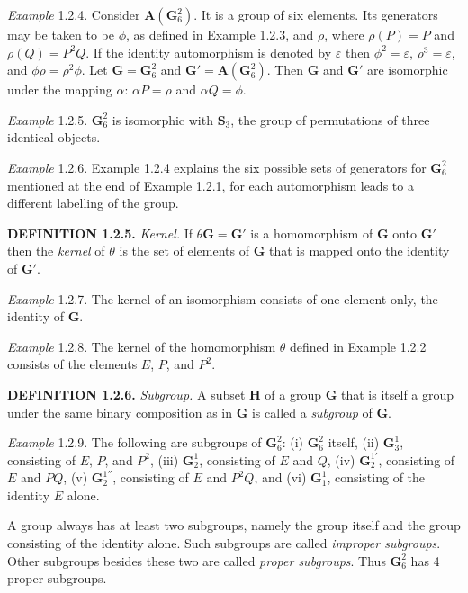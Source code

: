 \documentclass[11pt,a4paper,twoside,openright]{book}
\begin{document}
\textit{Example} 1.2.4. Consider $\mathbf{A}(\mathbf{G}_6^2)$. It is a group of six elements. Its generators may be taken to be $\phi$, as defined in Example 1.2.3, and $\rho$, where $\rho(P) = P$ and $\rho(Q) = P^{2}Q$. If the identity automorphism is denoted by $\varepsilon$ then $\phi^{2} = \varepsilon$, $\rho^{3} = \varepsilon$, and $\phi\rho = \rho^{2}\phi$. Let $\mathbf{G} = \mathbf{G}_6^2$ and $\mathbf{G}' = \mathbf{A}(\mathbf{G}_6^2)$. Then $\mathbf{G}$ and $\mathbf{G}'$ are isomorphic under the mapping $\alpha$: $\alpha P = \rho$ and $\alpha Q = \phi$.

\textit{Example} 1.2.5. $\mathbf{G}_6^2$ is isomorphic with $\mathbf{S}_3$, the group of permutations of three identical objects.

\textit{Example} 1.2.6. Example 1.2.4 explains the six possible sets of generators for $\mathbf{G}_6^2$ mentioned at the end of Example 1.2.1, for each automorphism leads to a different labelling of the group.

\textbf{DEFINITION 1.2.5.} \textit{Kernel.} If $\theta\mathbf{G} = \mathbf{G}'$ is a homomorphism of $\mathbf{G}$ onto $\mathbf{G}'$ then the \textit{kernel} of $\theta$ is the set of elements of $\mathbf{G}$ that is mapped onto the identity of $\mathbf{G}'$.

\textit{Example} 1.2.7. The kernel of an isomorphism consists of one element only, the identity of $\mathbf{G}$.

\textit{Example} 1.2.8. The kernel of the homomorphism $\theta$ defined in Example 1.2.2 consists of the elements $E$, $P$, and $P^{2}$.

\textbf{DEFINITION 1.2.6.} \textit{Subgroup.} A subset $\mathbf{H}$ of a group $\mathbf{G}$ that is itself a group under the same binary composition as in $\mathbf{G}$ is called a \textit{subgroup} of $\mathbf{G}$.

\textit{Example} 1.2.9. The following are subgroups of $\mathbf{G}_6^2$: (i) $\mathbf{G}_6^2$ itself, (ii) $\mathbf{G}_3^1$, consisting of $E$, $P$, and $P^{2}$, (iii) $\mathbf{G}_2^1$, consisting of $E$ and $Q$, (iv) $\mathbf{G}_2^{1'}$, consisting of $E$ and $PQ$, (v) $\mathbf{G}_2^{1''}$, consisting of $E$ and $P^{2}Q$, and (vi) $\mathbf{G}_1^1$, consisting of the identity $E$ alone.

A group always has at least two subgroups, namely the group itself and the group consisting of the identity alone. Such subgroups are called \textit{improper subgroups}. Other subgroups besides these two are called \textit{proper subgroups}. Thus $\mathbf{G}_6^2$ has 4 proper subgroups.
\end{document}
